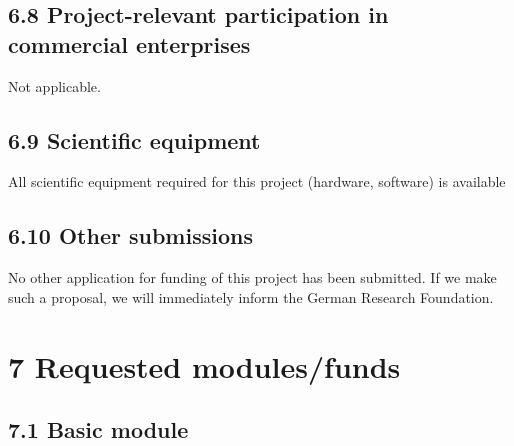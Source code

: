 \documentclass[11pt,a4paper]{article}
\theoremstyle{plain} \newtheorem{define}{Definition}[section]
\begin{document}
{%
\subsection*{6.8 Project-relevant participation in commercial enterprises}
%
\vspace{-0.4cm}
Not applicable.
\vspace{-0.4cm}


\subsection*{6.9 Scientific equipment}
%
\vspace{-0.4cm}
All scientific equipment required for this project (hardware, software) is available
\vspace{-0.4cm}



\subsection*{6.10 Other submissions}
%
\vspace{-0.4cm}
No other application for funding of this project has been submitted.
If we make such a proposal, we will immediately inform the German Research Foundation.
\vspace{-0.4cm}




\section*{7 Requested modules/funds}

\subsection*{7.1 Basic module}

}
\end{document}
